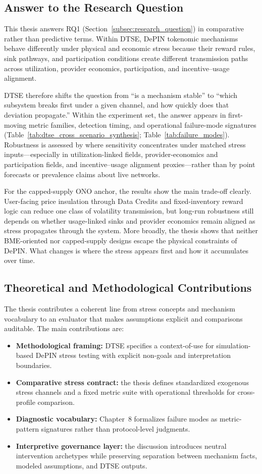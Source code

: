 \subsection{Answer to the Research Question}
This thesis answers RQ1 (Section~\ref{subsec:research_question}) in comparative rather than predictive terms. Within DTSE, DePIN tokenomic mechanisms behave differently under physical and economic stress because their reward rules, sink pathways, and participation conditions create different transmission paths across utilization, provider economics, participation, and incentive--usage alignment.

DTSE therefore shifts the question from ``is a mechanism stable'' to ``which subsystem breaks first under a given channel, and how quickly does that deviation propagate.'' Within the experiment set, the answer appears in first-moving metric families, detection timing, and operational failure-mode signatures (Table~\ref{tab:dtse_cross_scenario_synthesis}; Table~\ref{tab:failure_modes}). Robustness is assessed by where sensitivity concentrates under matched stress inputs---especially in utilization-linked fields, provider-economics and participation fields, and incentive--usage alignment proxies---rather than by point forecasts or prevalence claims about live networks.

For the capped-supply ONO anchor, the results show the main trade-off clearly. User-facing price insulation through Data Credits and fixed-inventory reward logic can reduce one class of volatility transmission, but long-run robustness still depends on whether usage-linked sinks and provider economics remain aligned as stress propagates through the system. More broadly, the thesis shows that neither BME-oriented nor capped-supply designs escape the physical constraints of DePIN. What changes is where the stress appears first and how it accumulates over time.

\subsection{Theoretical and Methodological Contributions}
The thesis contributes a coherent line from stress concepts and mechanism vocabulary to an evaluator that makes assumptions explicit and comparisons auditable. The main contributions are:
\begin{itemize}
    \item \textbf{Methodological framing:} DTSE specifies a context-of-use for simulation-based DePIN stress testing with explicit non-goals and interpretation boundaries.
    \item \textbf{Comparative stress contract:} the thesis defines standardized exogenous stress channels and a fixed metric suite with operational thresholds for cross-profile comparison.
    \item \textbf{Diagnostic vocabulary:} Chapter~8 formalizes failure modes as metric-pattern signatures rather than protocol-level judgments.
    \item \textbf{Interpretive governance layer:} the discussion introduces neutral intervention archetypes while preserving separation between mechanism facts, modeled assumptions, and DTSE outputs.
\end{itemize}

